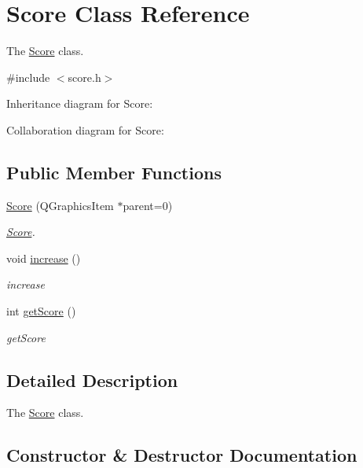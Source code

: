 \hypertarget{class_score}{}\section{Score Class Reference}
\label{class_score}


The \hyperlink{class_score}{Score} class.  




{\ttfamily \#include $<$score.\+h$>$}



Inheritance diagram for Score\+:


Collaboration diagram for Score\+:
\subsection*{Public Member Functions}
\begin{DoxyCompactItemize}
\item 
\hyperlink{class_score_af7c3392a27388a66b8a94448a995634d}{Score} (Q\+Graphics\+Item $\ast$parent=0)
\begin{DoxyCompactList}\small\item\em \hyperlink{class_score}{Score}. \end{DoxyCompactList}\item 
void \hyperlink{class_score_ab5dbfab6935903c075509546878cfbda}{increase} ()\hypertarget{class_score_ab5dbfab6935903c075509546878cfbda}{}\label{class_score_ab5dbfab6935903c075509546878cfbda}

\begin{DoxyCompactList}\small\item\em increase \end{DoxyCompactList}\item 
int \hyperlink{class_score_a8627c93270c188a3fd28a25b1d07a9e7}{get\+Score} ()
\begin{DoxyCompactList}\small\item\em get\+Score \end{DoxyCompactList}\end{DoxyCompactItemize}


\subsection{Detailed Description}
The \hyperlink{class_score}{Score} class. 

\subsection{Constructor \& Destructor Documentation}
